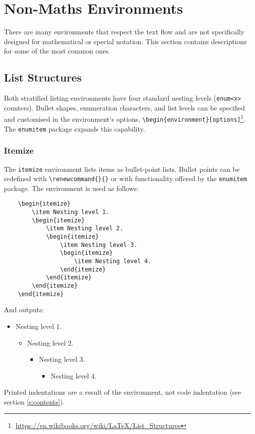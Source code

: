 \chapter{Non-Maths Environments}
%
There are many environments that respect the text flow and are not specifically designed for mathematical or special notation. This section contains descriptions for some of the most common ones.
%
\section{List Structures}
%
Both stratified listing environments have four standard nesting levels (\verb|enum<x>| counters). Bullet shapes, enumeration characters, and list levels can be specified and customised in the environment's options, \verb|\begin{environment}[options]|\footnote{\url{https://en.wikibooks.org/wiki/LaTeX/List_Structures}}. The \verb|enumitem| package expands this capability.
%
\subsection{Itemize}
%
The \verb|itemize| environment lists items as bullet-point lists. Bullet points can be redefined with \verb|\renewcommand{}{}| or with functionality offered by the \verb|enumitem| package. The environment is used as follows:
\begin{verbatim}
	\begin{itemize}
    	\item Nesting level 1.
	    \begin{itemize}
    	    \item Nesting level 2.
        	\begin{itemize}
            	\item Nesting level 3.
	            \begin{itemize}
    	            \item Nesting level 4.
        	    \end{itemize}
	        \end{itemize}
	    \end{itemize}
	\end{itemize}
\end{verbatim}
And outputs:
\begin{itemize}
    \item Nesting level 1.
    \begin{itemize}
        \item Nesting level 2.
        \begin{itemize}
            \item Nesting level 3.
            \begin{itemize}
                \item Nesting level 4.
            \end{itemize}
        \end{itemize}
    \end{itemize}
\end{itemize}
Printed indentations are a result of the environment, not code indentation (see section \ref{s:contents}).
%
